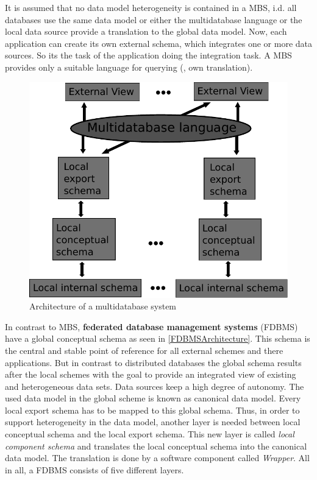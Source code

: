 It is assumed that no data model heterogeneity is contained in a MBS, i.d. all databases use the same data model or either the multidatabase language or the local data source provide a translation to the global data model. Now, each application can create its own external schema, which integrates one or more data sources. So its the task of the application doing the integration task. A MBS provides only a suitable language for querying (\cite[p. 93/94]{DBLP:books/dp/LeserN2006}, own translation).	
\begin{figure}[H]
	\begin{center}
		\includegraphics[scale=0.5]{figures/MultidatabaseArchitecture.pdf}
	\end{center}
	\caption{Architecture of a  multidatabase system}
	\label{MBSDatabaseArchitecture}
\end{figure}
In contrast to MBS, \textbf{federated database management systems} (FDBMS) have a global conceptual schema as seen in \ref{FDBMSArchitecture}. This schema is the central and stable point of reference for all external schemes and there applications. But in contrast to distributed databases the global schema results after the local schemes with the goal to provide an integrated view of existing and heterogeneous data sets. Data sources keep a high degree of autonomy.
The used data model in the global scheme is known as canonical data model. Every local export schema has to be mapped to this global schema. Thus, in order to support heterogeneity in the data model, another layer is needed between local conceptual schema and the local export schema. This new layer is called \textit{local component schema} and translates the local conceptual schema into the canonical data model. The translation is done by a software component called \textit{Wrapper}. All in all, a FDBMS consists of five different layers.
